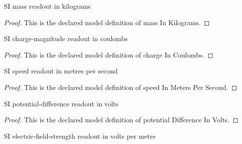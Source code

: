 \begin{definition}
  \label{def:physics:phyx-mini-0496:phyxminiproblems-problemphyxmini0496-massinkilograms}
  SI mass readout in kilograms
\end{definition}
\begin{proof}
  This is the declared model definition of mass In Kilograms.
\end{proof}
\begin{definition}
  \label{def:physics:phyx-mini-0496:phyxminiproblems-problemphyxmini0496-chargeincoulombs}
  SI charge-magnitude readout in coulombs
\end{definition}
\begin{proof}
  This is the declared model definition of charge In Coulombs.
\end{proof}
\begin{definition}
  \label{def:physics:phyx-mini-0496:phyxminiproblems-problemphyxmini0496-speedinmeterspersecond}
  SI speed readout in metres per second
\end{definition}
\begin{proof}
  This is the declared model definition of speed In Meters Per Second.
\end{proof}
\begin{definition}
  \label{def:physics:phyx-mini-0496:phyxminiproblems-problemphyxmini0496-potentialdifferenceinvolts}
  SI potential-difference readout in volts
\end{definition}
\begin{proof}
  This is the declared model definition of potential Difference In Volts.
\end{proof}
\begin{definition}
  \label{def:physics:phyx-mini-0496:phyxminiproblems-problemphyxmini0496-electricfieldstrengthinvoltspermeter}
  SI electric-field-strength readout in volts per metre
\end{definition}

